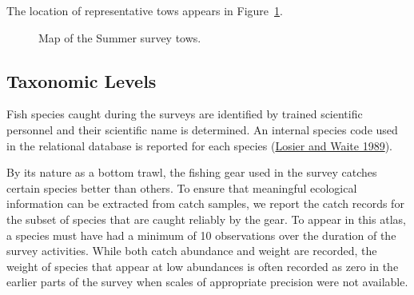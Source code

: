 \documentclass[12pt]{article}\usepackage[]{graphicx}\usepackage[]{color}
\begin{document}
The location of representative tows appears in Figure~\ref{fig:map3}.


\begin{figure}[htb]

{\centering {} 

}

\caption{Map of the Summer survey tows.}\label{fig:map3}
\end{figure}
\hypertarget{taxo}{%
\subsection{Taxonomic Levels}\label{taxo}}

Fish species caught during the surveys are identified by trained scientific personnel and their scientific name is determined. An internal species code used in the relational database is reported for each species (\protect\hyperlink{ref-LosierWaite1989}{Losier and Waite 1989}).

By its nature as a bottom trawl, the fishing gear used in the survey catches certain species better than others. To ensure that meaningful ecological information can be extracted from catch samples, we report the catch records for the subset of species that are caught reliably by the gear. To appear in this atlas, a species must have had a minimum of 10 observations over the duration of the survey activities. While both catch abundance and weight are recorded, the weight of species that appear at low abundances is often recorded as zero in the earlier parts of the survey when scales of appropriate precision were not available.
\end{document}
